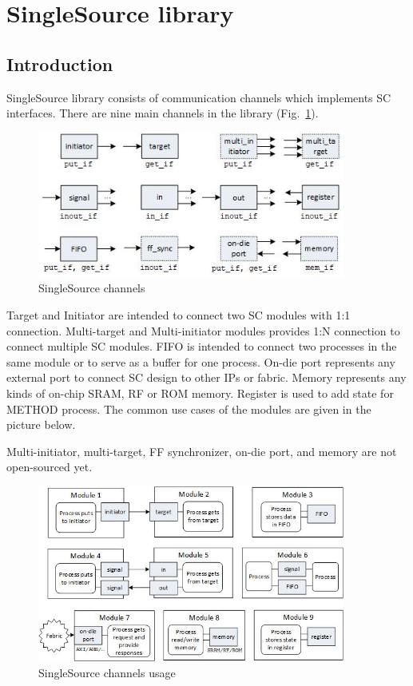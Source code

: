 \section{SingleSource library}\label{section:singl_src}

\subsection{Introduction}

SingleSource library consists of communication channels which implements SC interfaces. There are nine main channels in the library (Fig.~\ref{fig:ss_channels}).

\begin{figure}[!htb]
\centering
\includegraphics[width=0.9\textwidth]{pics/ss_channels.jpg}
\caption{SingleSource channels}
\label{fig:ss_channels}
\end{figure}

Target and Initiator are intended to connect two SC modules with 1:1 connection. Multi-target and Multi-initiator modules provides 1:N connection to connect multiple SC modules. FIFO is intended to connect two processes in the same module or to serve as a buffer for one process.
On-die port represents any external port to connect SC design to other IPs or fabric. Memory represents any kinds of on-chip SRAM, RF or ROM memory. Register is used to add state for METHOD process. The common use cases of the modules are given in the picture below.

Multi-initiator, multi-target, FF synchronizer, on-die port, and memory are not open-sourced yet.

\begin{figure}[!htb]
\centering
\includegraphics[width=0.9\textwidth]{pics/ss_usage.jpg}
\caption{SingleSource channels usage}
\label{fig:ss_usage}
\end{figure}


